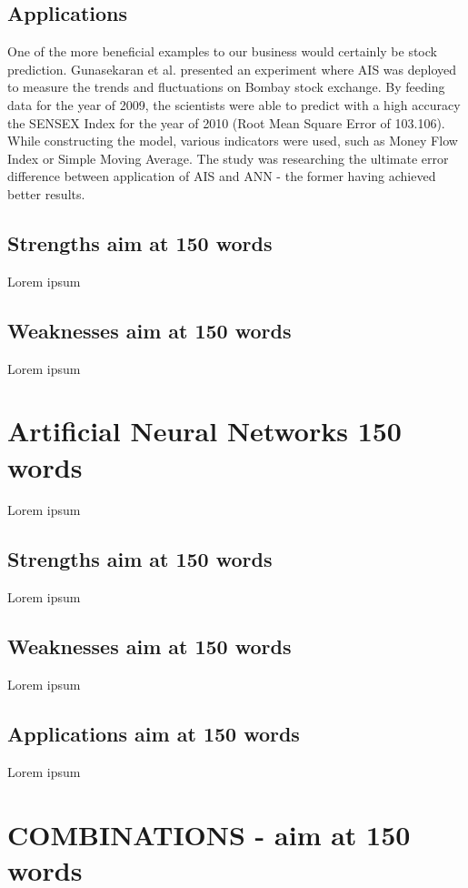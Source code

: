 \documentclass[letterpaper, 10 pt, conference]{ieeeconf}  %
\begin{document}
\subsection{Applications}
One of the more beneficial examples to our business would certainly be stock prediction. Gunasekaran et al. \cite{gunasekaran2011evaluation} presented an experiment where AIS was deployed to measure the trends and fluctuations on Bombay stock exchange. By feeding data for the year of 2009, the scientists were able to predict with a high accuracy the SENSEX Index for the year of 2010 (Root Mean Square Error of 103.106). While constructing the model, various indicators were used, such as Money Flow Index or Simple Moving Average. The study was researching the ultimate error difference between application of AIS and ANN - the former having achieved better results.

\subsection{Strengths aim at 150 words} 
Lorem ipsum

\subsection{Weaknesses aim at 150 words}
Lorem ipsum


\section{Artificial Neural Networks 150 words}
Lorem ipsum

\subsection{Strengths aim at 150 words}
Lorem ipsum

\subsection{Weaknesses aim at 150 words}
Lorem ipsum

\subsection{Applications aim at 150 words}
Lorem ipsum


\section{COMBINATIONS - aim at 150 words}
\end{document}
